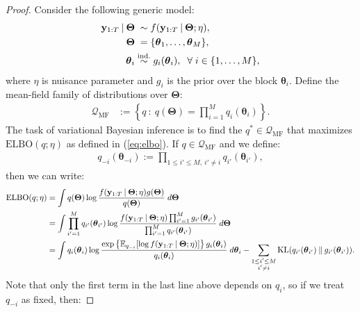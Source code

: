 \begin{proof}

Consider the following generic model:
\begin{align*}
    \mathbf{y}_{1:T} \:|\: \boldsymbol{\Theta} &\;\sim f(\mathbf{y}_{1:T}\:|\: \boldsymbol{\Theta};\eta), \\ 
    \boldsymbol{\Theta} &\;= \{\boldsymbol{\theta}_1, \ldots, \boldsymbol{\theta}_M\}, \\
    \boldsymbol{\theta}_i &\overset{\text{ind.}}{\sim} g_i(\boldsymbol{\theta}_i),\; \;\forall\; i \in \{1, \ldots, M\},
\end{align*}
where $\eta$ is nuisance parameter and $g_i$ is the prior over the block $\boldsymbol{\theta}_i$. Define the mean-field family of distributions over $\boldsymbol{\Theta}$:
\begin{align*} 
    \mathcal{Q}_{\text{MF}} &:= \left\{q \::\: q(\boldsymbol{\Theta}) = \prod_{i=1}^M q_i(\boldsymbol{\theta}_i)\right\}.
\end{align*}
The task of variational Bayesian inference is to find the $q^* \in \mathcal{Q}_{\text{MF}}$ that maximizes $\text{ELBO}(q;\eta)$ as defined in (\ref{eq:elbo}). If $q \in \mathcal{Q}_{\text{MF}}$ and we define:
\begin{align*}
    q_{-i}(\boldsymbol{\theta}_{-i}) := \prod_{1\leq i' \leq M,\:i'\neq i} q_{i'}(\boldsymbol{\theta}_{i'}),
\end{align*}
then we can write:
\begin{align*}
    \text{ELBO}(q;\eta) &= \int q(\boldsymbol{\Theta}) \log \frac{f(\mathbf{y}_{1:T}\:|\: \boldsymbol{\Theta};\eta) g(\boldsymbol{\Theta})}{q(\boldsymbol{\Theta})} \; d\boldsymbol{\Theta} \\
    &= \int \prod_{i'=1}^M q_{i'}(\boldsymbol{\theta}_{i'}) \log \frac{ f(\mathbf{y}_{1:T}\:|\: \boldsymbol{\Theta};\eta) \prod_{i'=1}^M g_{i'}(\boldsymbol{\theta}_{i'})}{\prod_{i'=1}^M q_{i'}(\boldsymbol{\theta}_{i'})} \; d\boldsymbol{\Theta} \\
    &= \int q_{i}(\boldsymbol{\theta}_i) \log \frac{\exp\left\{\mathbb{E}_{q_{-i}}[\log f(\mathbf{y}_{1:T}\:|\: \boldsymbol{\Theta};\eta)]\right\}g_{i}(\boldsymbol{\theta}_i)}{q_{i}(\boldsymbol{\theta}_i)} \; d\boldsymbol{\theta}_i - \sum_{\substack{1 \leq i' \leq M \\ i' \neq i}} \text{KL}(q_{i'}(\boldsymbol{\theta}_{i'})\:\lVert\: g_{i'}(\boldsymbol{\theta}_{i'})).
\end{align*}
Note that only the first term in the last line above depends on $q_i$, so if we treat $q_{-i}$ as fixed, then: 

\end{proof}
